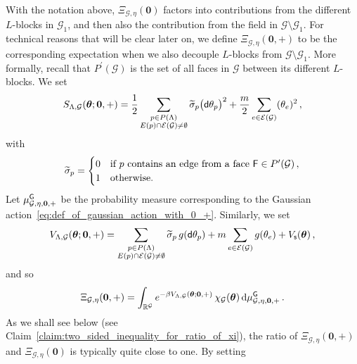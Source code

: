 \documentclass[11pt]{article}
\theoremstyle{definition}
\theoremstyle{remark}
\numberwithin{theorem}{section}
\newcommand{\bR}{\mathbb R}
\newcommand{\cE}{\mathcal{E}}
\newcommand{\cG}{\mathcal G}
\begin{document}
    With the notation above, $\Xi_\mathcal{G,\eta}(\mathbf{0})$ factors into contributions from the different $L$-blocks in $\mathcal{G}_1$, and then also the contribution from the field in $\mathcal{G}\setminus \mathcal{G}_1$. For technical reasons that will be clear later on, we define $\Xi_{\mathcal{G},\eta}(\mathbf{0},+)$ to be the corresponding expectation when we also decouple $L$-blocks from $\mathcal{G}\setminus \mathcal{G}_1$. More formally, recall that $P^\prime(\mathcal{G})$ is the set of all faces in $\mathcal{G}$ between its different $L$-blocks. We set 
    \begin{equation}
        \label{eq:def_of_gaussian_action_with_0_+}
        S_{\Lambda,\mathcal{G}}(\boldsymbol{\theta};\mathbf{0},+) = \frac{1}{2} \sum_{\substack{p\in P(\Lambda) \\ E(p)\cap \cE(\mathcal{G})\not= \emptyset}}  \widetilde\sigma_p \big({\sf d}\theta_p\big)^2 + \frac{m}{2}\sum_{e\in \cE(\mathcal{G})} (\theta_e)^2 \, , 
    \end{equation}
    with
    \[
    \widetilde \sigma_p = \begin{cases}
        0 & \text{if $p$ contains an edge from a face }{\sf F} \in P^\prime(\mathcal{G}) \, ,  \\ 1 & \text{otherwise.}
    \end{cases}
    \]
    Let $\mu_{\mathcal{G},\eta,\mathbf{0},+}^{\sf G}$ be the probability measure corresponding to the Gaussian action~\eqref{eq:def_of_gaussian_action_with_0_+}. Similarly, we set 
        \begin{equation*}
        V_{\Lambda,\cG}(\boldsymbol\theta;\mathbf{0},+) = \sum_{\substack{p\in P(\Lambda) \\ E(p)\cap \cE(\mathcal{G}) \not= \emptyset}} \widetilde \sigma_p \,   g({\sf d}\theta_p) + m \sum_{e\in \cE(\cG)} g(\theta_e)  + V_{{\sf s}}(\boldsymbol\theta)\, , 
    \end{equation*}
    and so
    \begin{equation}
    \label{eq:def_of_Xi_0_+}
        \Xi_{\mathcal{G},\eta}(\mathbf{0},+) = \int_{\bR^{\mathcal{G}}} e^{-\beta V_{\Lambda,\mathcal{G}}(\boldsymbol{\theta};\mathbf{0},+)} \, \chi_{\mathcal{G}}(\boldsymbol{\theta}) \, {\rm d}\mu_{\mathcal{G},\eta,\mathbf{0},+}^{\sf G} \, .
    \end{equation}
    As we shall see below (see Claim~\ref{claim:two_sided_inequality_for_ratio_of_xi}), the ratio of $\Xi_{\mathcal{G},\eta}(\mathbf{0},+)$ and $\Xi_{\mathcal{G},\eta}(\mathbf{0})$ is typically quite close to one. By setting
\end{document}
